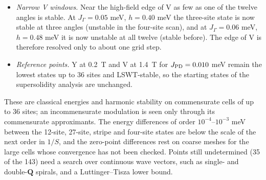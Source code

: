 \begin{itemize}
  four-site state, and unstable at the other three points. At
  \(J_{\rm PD}=0.0125\) meV, \(h=0.40\)--0.44 meV, the lowest state is
  the two-site stripe, stable on the second mesh; at \(h=0.46\) meV it
  is weakly unstable (\(-1.2\times10^{-5}\) meV).
\item
  \emph{Narrow V windows.} Near the high-field edge of V as few as one
  of the twelve angles is stable. At \(J_\Gamma=0.05\) meV,
  \(h=0.40\) meV the three-site state is now stable at three angles
  (unstable in the four-site scan), and at \(J_\Gamma=0.06\) meV,
  \(h=0.48\) meV it is now unstable at all twelve (stable before). The
  edge of V is therefore resolved only to about one grid step.
\item
  \emph{Reference points.} Y at 0.2~T and V at 1.4~T for
  \(J_{\rm PD}=0.010\) meV remain the lowest states up to 36 sites and
  LSWT-stable, so the starting states of the supersolidity analysis are
  unchanged.
\end{itemize}

These are classical energies and harmonic stability on commensurate
cells of up to 36 sites; an incommensurate modulation is seen only
through its commensurate approximants. The energy differences of order
\(10^{-4}\)--\(10^{-3}\) meV between the 12-site, 27-site, stripe and
four-site states are below the scale of the next order in \(1/S\), and
the zero-point differences rest on coarse meshes for the large cells
whose convergence has not been checked. Points still undetermined (35
of the 143) need a search over continuous wave vectors, such as single-
and double-\(\mathbf Q\) spirals, and a Luttinger--Tisza lower bound.

